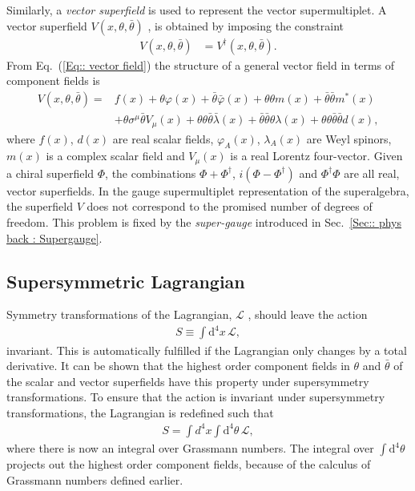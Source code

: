 \documentclass[twoside,english]{uiofysmaster}
\begin{document}
Similarly, a \textit{vector superfield} is used to represent the vector supermultiplet. A vector superfield  $V(x, \theta, \bar{\theta})$ , is obtained by imposing the constraint
\begin{align}
V (x, \theta, \bar{\theta}) &= V^{\dagger} (x, \theta, \bar{\theta}).\label{Eq:: vector field}
\end{align}
From Eq.\ (\ref{Eq:: vector field}) the structure of a general vector field in terms of component fields is \cite{Martin:1997ns}
\begin{align}
V (x, \theta, \bar{\theta}) =& f(x) + \theta \varphi (x) + \bar{\theta} \bar{\varphi} (x) + \theta \theta m(x) + \bar{\theta} \bar{\theta} m^* (x) \nonumber \\
&+ \theta \sigma^{\mu} \bar{\theta} V_{\mu} (x) + \theta \theta \bar{\theta} \bar{\lambda} (x) + \bar{\theta} \bar{\theta} \theta \lambda (x) + \theta \theta \bar{\theta} \bar{\theta} d(x),
\end{align}
where $f(x)$, $d(x)$ are real scalar fields, $\varphi_A (x)$, $\lambda_A (x)$ are Weyl spinors, $m(x)$ is a complex scalar field and $V_{\mu} (x)$ is a real Lorentz four-vector. Given a chiral superfield $\Phi$, the combinations $\Phi + \Phi^{\dagger}$, $i (\Phi - \Phi^{\dagger})$ and $\Phi^{\dagger} \Phi$ are all real, vector superfields. In the gauge supermultiplet representation of the superalgebra, the superfield $V$ does not correspond to the promised number of degrees of freedom. This problem is fixed by the \textit{super-gauge} introduced in Sec.~\ref{Sec:: phys back : Supergauge}. 



\subsection{Supersymmetric Lagrangian}

Symmetry transformations of the Lagrangian, $\mathcal{L}$ , should leave the action
\begin{align}
S \equiv \int \mathrm{d}^4x \, \mathcal{L},
\end{align}
 invariant. This is automatically fulfilled if the Lagrangian only changes by a total derivative. It can be shown that the highest order component fields in $\theta$ and $\bar{\theta}$ of the scalar and vector superfields have this property under supersymmetry transformations. To ensure that the action is invariant under supersymmetry transformations, the Lagrangian is redefined such that
\begin{align}
S = \int d^4x \int \mathrm{d}^4 \theta \, \mathcal{L},
\end{align}
where there is now an integral over Grassmann numbers. The integral over $\int \mathrm{d}^4 \theta$ projects out the highest order component fields, because of the calculus of Grassmann numbers defined earlier.
\end{document}
